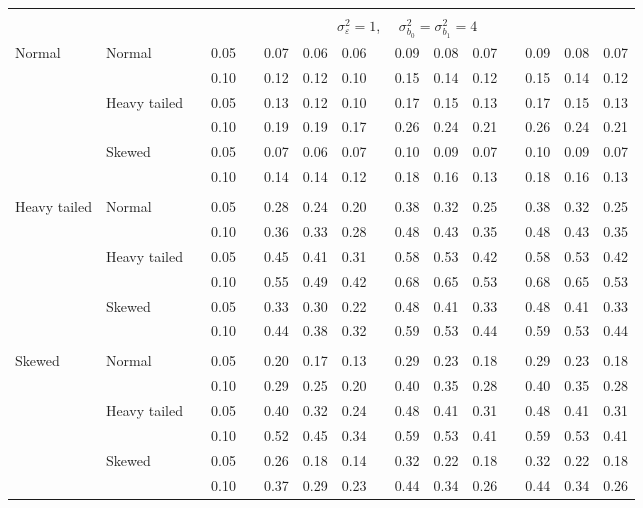 \documentclass{article} %
\begin{document}
\begin{table}[ht]
\begin{scriptsize}
\begin{center}
\begin{tabular}{ll p{.1cm} c p{.1cm} rrr p{.1cm} rrr p{.1cm} rrr}
&&&&&&&&&&&&&&&\\
& && && \multicolumn{9}{c}{$\sigma_{\varepsilon}^2 = 1$, \ \ $\sigma_{b_0}^2 = \sigma_{b_1}^2 = 4$} \\ \cline{6-16}
Normal       & Normal       && 0.05 &&  0.07 & 0.06 & 0.06 && 0.09 & 0.08 & 0.07 && 0.09 & 0.08 & 0.07 \\ 
             &              && 0.10 &&  0.12 & 0.12 & 0.10 && 0.15 & 0.14 & 0.12 && 0.15 & 0.14 & 0.12 \\ 
             & Heavy tailed && 0.05 &&  0.13 & 0.12 & 0.10 && 0.17 & 0.15 & 0.13 && 0.17 & 0.15 & 0.13 \\ 
             &              && 0.10 &&  0.19 & 0.19 & 0.17 && 0.26 & 0.24 & 0.21 && 0.26 & 0.24 & 0.21 \\ 
             & Skewed       && 0.05 &&  0.07 & 0.06 & 0.07 && 0.10 & 0.09 & 0.07 && 0.10 & 0.09 & 0.07 \\ 
             &              && 0.10 &&  0.14 & 0.14 & 0.12 && 0.18 & 0.16 & 0.13 && 0.18 & 0.16 & 0.13 \\ 
             &&&&&&&&&&&&&&&\\
Heavy tailed & Normal       && 0.05 &&  0.28 & 0.24 & 0.20 && 0.38 & 0.32 & 0.25 && 0.38 & 0.32 & 0.25 \\ 
             &              && 0.10 &&  0.36 & 0.33 & 0.28 && 0.48 & 0.43 & 0.35 && 0.48 & 0.43 & 0.35 \\ 
             & Heavy tailed && 0.05 &&  0.45 & 0.41 & 0.31 && 0.58 & 0.53 & 0.42 && 0.58 & 0.53 & 0.42 \\ 
             &              && 0.10 &&  0.55 & 0.49 & 0.42 && 0.68 & 0.65 & 0.53 && 0.68 & 0.65 & 0.53 \\ 
             & Skewed       && 0.05 &&  0.33 & 0.30 & 0.22 && 0.48 & 0.41 & 0.33 && 0.48 & 0.41 & 0.33 \\ 
             &              && 0.10 &&  0.44 & 0.38 & 0.32 && 0.59 & 0.53 & 0.44 && 0.59 & 0.53 & 0.44 \\ 
             &&&&&&&&&&&&&&&\\
Skewed       & Normal       && 0.05 &&  0.20 & 0.17 & 0.13 && 0.29 & 0.23 & 0.18 && 0.29 & 0.23 & 0.18 \\ 
             &              && 0.10 &&  0.29 & 0.25 & 0.20 && 0.40 & 0.35 & 0.28 && 0.40 & 0.35 & 0.28 \\ 
             & Heavy tailed && 0.05 &&  0.40 & 0.32 & 0.24 && 0.48 & 0.41 & 0.31 && 0.48 & 0.41 & 0.31 \\ 
             &              && 0.10 &&  0.52 & 0.45 & 0.34 && 0.59 & 0.53 & 0.41 && 0.59 & 0.53 & 0.41 \\ 
             & Skewed       && 0.05 &&  0.26 & 0.18 & 0.14 && 0.32 & 0.22 & 0.18 && 0.32 & 0.22 & 0.18 \\ 
             &              && 0.10 &&  0.37 & 0.29 & 0.23 && 0.44 & 0.34 & 0.26 && 0.44 & 0.34 & 0.26 \\ 



\end{tabular}
\end{center}
\end{scriptsize}
\end{table}
\end{document}

